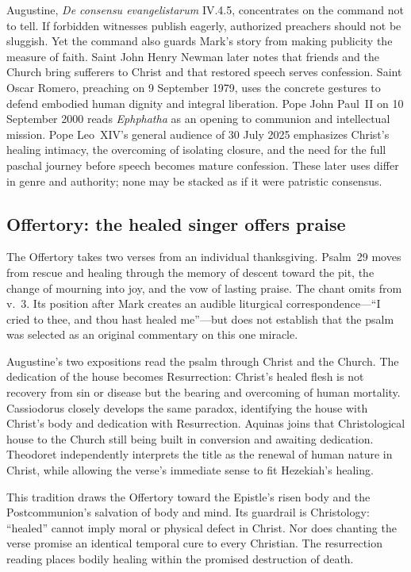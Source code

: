 Augustine, \emph{De consensu evangelistarum} IV.4.5, concentrates on the
command not to tell. If forbidden witnesses publish eagerly, authorized
preachers should not be sluggish. Yet the command also guards Mark's story
from making publicity the measure of faith. Saint John Henry Newman later
notes that friends and the Church bring sufferers to Christ and that restored
speech serves confession. Saint Oscar Romero, preaching on 9 September 1979,
uses the concrete gestures to defend embodied human dignity and integral
liberation. Pope John Paul~II on 10 September 2000 reads \emph{Ephphatha} as
an opening to communion and intellectual mission. Pope Leo~XIV's general
audience of 30 July 2025 emphasizes Christ's healing intimacy, the overcoming
of isolating closure, and the need for the full paschal journey before speech
becomes mature confession. These later uses differ in genre and authority;
none may be stacked as if it were patristic consensus.

\subsection*{Offertory: the healed singer offers praise\enspace{}}

The Offertory takes two verses from an individual thanksgiving. Psalm~29
moves from rescue and healing through the memory of descent toward the pit,
the change of mourning into joy, and the vow of lasting praise. The chant
omits  from v.~3. Its position after Mark creates an audible
liturgical correspondence---``I cried to thee, and thou hast healed me''---but
does not establish that the psalm was selected as an original commentary on
this one miracle.

Augustine's two expositions read the psalm through Christ and the Church.
The dedication of the house becomes Resurrection: Christ's healed flesh is
not recovery from sin or disease but the bearing and overcoming of human
mortality. Cassiodorus closely develops the same paradox, identifying the
house with Christ's body and dedication with Resurrection. Aquinas joins that
Christological house to the Church still being built in conversion and
awaiting dedication. Theodoret independently interprets the title as the
renewal of human nature in Christ, while allowing the verse's immediate sense
to fit Hezekiah's healing.

This tradition draws the Offertory toward the Epistle's risen body and the
Postcommunion's salvation of body and mind. Its guardrail is Christology:
``healed'' cannot imply moral or physical defect in Christ. Nor does chanting
the verse promise an identical temporal cure to every Christian. The
resurrection reading places bodily healing within the promised destruction of
death.

